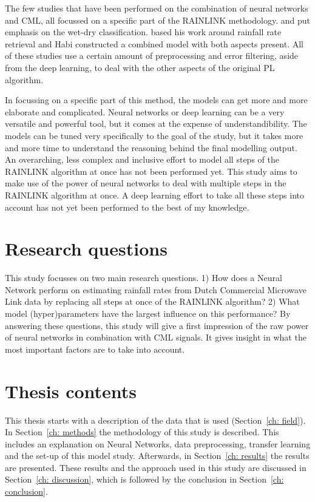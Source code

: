\documentclass[twocolumn, 10pt, a4paper]{memoir}
\begin{document}
	The few studies that have been performed on the combination of neural networks and CML, all focussed on a specific part of the RAINLINK methodology.  and  put emphasis on the wet-dry classification.  based his work around rainfall rate retrieval and Habi  constructed a combined model with both aspects present. All of these studies use a certain amount of preprocessing and error filtering, aside from the deep learning, to deal with the other aspects of the original PL algorithm.
	
	In focussing on a specific part of this method, the models can get more and more elaborate and complicated. Neural networks or deep learning can be a very versatile and powerful tool, but it comes at the expense of understandibility. The models can be tuned very specifically to the goal of the study, but it takes more and more time to understand the reasoning behind the final modelling output. An overarching, less complex and inclusive effort to model all steps of the RAINLINK algorithm at once has not been performed yet. This study aims to make use of the power of neural networks to deal with multiple steps in the RAINLINK algorithm at once. A deep learning effort to take all these steps into account has not yet been performed to the best of my knowledge.  
	
	
	\section{Research questions}
	This study focusses on two main research questions.
	1) How does a Neural Network perform on estimating rainfall rates from Dutch Commercial Microwave Link data by replacing all steps at once of the RAINLINK algorithm?
	2) What model (hyper)parameters have the largest influence on this performance?
	By answering these questions, this study will give a first impression of the raw power of neural networks in combination with CML signals. It gives insight in what the most important factors are to take into account. 
	
	
	\section{Thesis contents}
	This thesis starts with a description of the data that is used (Section~\ref{ch: field}). In Section~\ref{ch: methods} the methodology of this study is described. This includes an explanation on Neural Networks, data preprocessing, transfer learning and the set-up of this model study. Afterwards, in Section~\ref{ch: results} the results are presented. These results and the approach used in this study are discussed in Section~\ref{ch: discussion}, which is followed by the conclusion in Section~\ref{ch: conclusion}.
	
\end{document}
